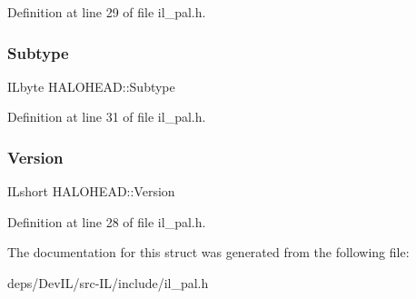 Definition at line 29 of file il\+\_\+pal.\+h.

\mbox{\label{structHALOHEAD_a69d7dcd5c67665cd2edfc23aa990072a}} 
\subsubsection{\texorpdfstring{Subtype}{Subtype}}
{\footnotesize\ttfamily I\+Lbyte H\+A\+L\+O\+H\+E\+A\+D\+::\+Subtype}



Definition at line 31 of file il\+\_\+pal.\+h.

\mbox{\label{structHALOHEAD_a579b6b2eb89e08141df4c918838ceb3b}} 
\subsubsection{\texorpdfstring{Version}{Version}}
{\footnotesize\ttfamily I\+Lshort H\+A\+L\+O\+H\+E\+A\+D\+::\+Version}



Definition at line 28 of file il\+\_\+pal.\+h.



The documentation for this struct was generated from the following file\+:\begin{DoxyCompactItemize}
\item 
deps/\+Dev\+I\+L/src-\/\+I\+L/include/il\+\_\+pal.\+h\end{DoxyCompactItemize}
